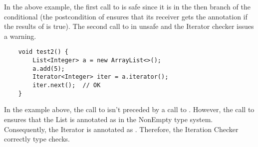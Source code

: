 In the above example, the first call to  is safe since it is in
the then branch of the conditional (the postcondition of  ensures that
its receiver gets the annotation  if the results of  is true).
The second call to  in unsafe and the Iterator checker issues a warning.

\begin{verbatim}
    void test2() {
        List<Integer> a = new ArrayList<>();
        a.add(5);
        Iterator<Integer> iter = a.iterator();
        iter.next();  // OK
    }
\end{verbatim}

In the example above, the call to  isn't preceded by a call to .
However, the call to  ensures that the List  is annotated as
 in the NonEmpty type system.
Consequently, the Iterator  is annotated as .
Therefore, the Iteration Checker correctly type checks.

